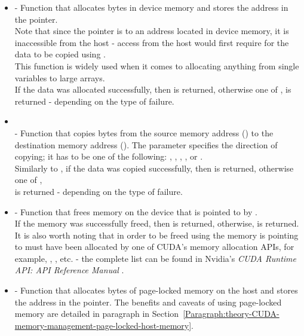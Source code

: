 \begin{itemize}
	\item {} - Function that allocates  bytes in device memory and stores the address in the  pointer. \\
	Note that since the pointer is to an address located in device memory, it is inaccessible from the host - access from the host would first require for the data to be copied using . \\
	This function is widely used when it comes to allocating anything from single variables to large arrays. \\
	If the data was allocated successfully, then  is returned, otherwise one of ,  is returned - depending on the type of failure.
	\item {}\\  - Function that copies  bytes from the source memory address () to the destination memory address (). The  parameter specifies the direction of copying; it has to be one of the following: , , , , or . \\
	Similarly to , if the data was copied successfully, then  is returned, otherwise one of , \\  is returned - depending on the type of failure.
	\item {} - Function that frees memory on the device that is pointed to by . \\
	If the memory was successfully freed, then  is returned, otherwise,  is returned. \\
	It is also worth noting that in order to be freed using  the memory  is pointing to must have been allocated by one of CUDA's memory allocation APIs, for example, , , etc. - the complete list can be found in Nvidia's \emph{CUDA Runtime API: API Reference Manual} \cite{NvidiaJanuary2022}.
	\item {} - Function that allocates  bytes of page-locked memory on the host and stores the address in the  pointer. The benefits and caveats of using page-locked memory are detailed in paragraph \textit{} in Section~\ref{Paragraph:theory-CUDA-memory-management-page-locked-host-memory}.
\end{itemize}

